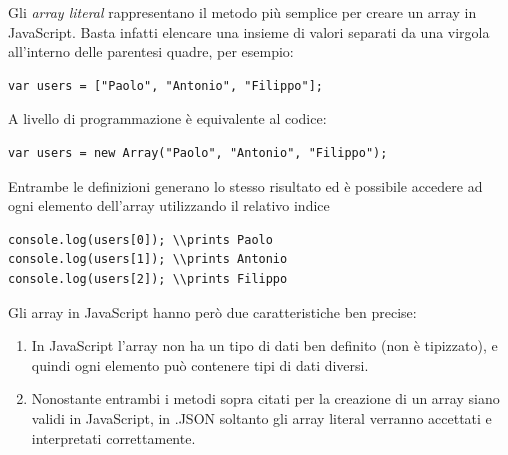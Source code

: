 Gli \emph{array literal} rappresentano il metodo più semplice per creare un array in JavaScript.
Basta infatti elencare una insieme di valori separati da una virgola all'interno delle parentesi quadre, per esempio:
\begin{lstlisting}[style=JavaScriptCode]
var users = ["Paolo", "Antonio", "Filippo"];
\end{lstlisting}
A livello di programmazione è equivalente al codice:
\begin{lstlisting}[style=JavaScriptCode]
var users = new Array("Paolo", "Antonio", "Filippo");
\end{lstlisting}
Entrambe le definizioni generano lo stesso risultato ed è possibile accedere ad ogni elemento dell'array utilizzando il relativo indice 
\begin{lstlisting}[style=JavaScriptCode]
console.log(users[0]); \\prints Paolo 
console.log(users[1]); \\prints Antonio
console.log(users[2]); \\prints Filippo
\end{lstlisting}
Gli array in JavaScript hanno però due caratteristiche ben precise:
\begin{enumerate}
	\item In JavaScript l'array non ha un tipo di dati ben definito (non è tipizzato), e quindi ogni elemento può contenere tipi di dati diversi.
	\item Nonostante entrambi i metodi sopra citati per la creazione di un array siano validi in JavaScript, in .JSON soltanto gli array literal verranno accettati e interpretati correttamente.
\end{enumerate}

